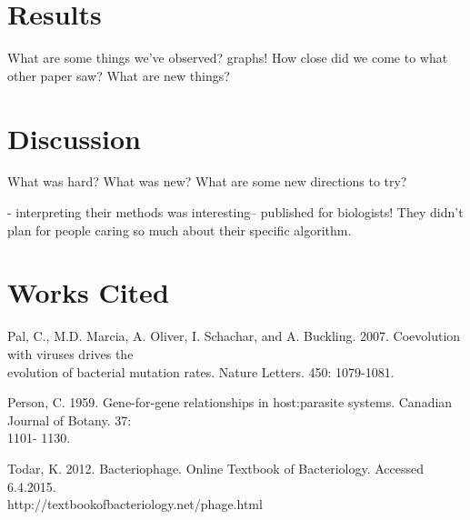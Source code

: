 \documentclass[11pt, oneside]{article}
\begin{document}
\section{Results}
What are some things we've observed? graphs! How close did we come to what other paper saw? What are new things?

\section{Discussion}
What was hard? What was new? What are some new directions to try?

- interpreting their methods was interesting-- published for biologists! They didn't plan for people caring so much about their specific algorithm. 

\section{Works Cited}
Pal, C., M.D. Marcia, A. Oliver, I. Schachar, and A. Buckling. 2007. Coevolution with viruses drives the \\\-\hspace{0.75cm} evolution of bacterial mutation rates. Nature Letters. 450: 1079-1081.

Person, C. 1959. Gene-for-gene relationships in host:parasite systems. Canadian Journal of Botany. 37: \\\-\hspace{0.75cm} 1101- 1130.

Todar, K. 2012. Bacteriophage. Online Textbook of Bacteriology. Accessed 6.4.2015.\\\-\hspace{0.75cm} http://textbookofbacteriology.net/phage.html
\end{document}

